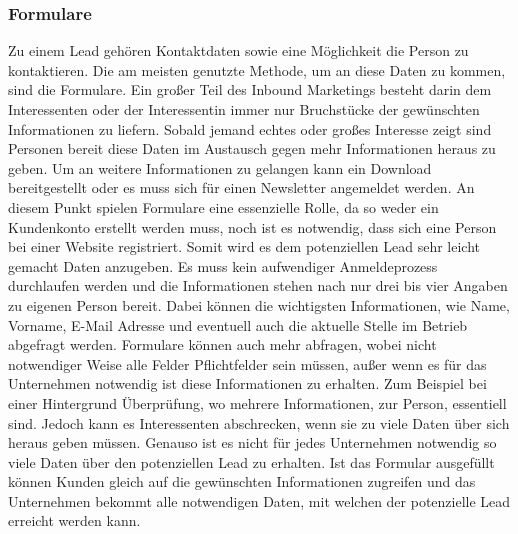 \subsubsection{Formulare}
Zu einem Lead gehören Kontaktdaten sowie eine Möglichkeit die Person zu kontaktieren. Die am meisten genutzte Methode, um an diese Daten zu kommen, sind die Formulare. 
\newline 
Ein großer Teil des Inbound Marketings besteht darin dem Interessenten oder der Interessentin immer nur Bruchstücke der gewünschten Informationen zu liefern. Sobald jemand echtes oder großes Interesse zeigt sind Personen bereit diese Daten im Austausch gegen mehr Informationen heraus zu geben. Um an weitere Informationen zu gelangen kann ein Download bereitgestellt oder es muss sich für einen Newsletter angemeldet werden. 
\newline
An diesem Punkt spielen Formulare eine essenzielle Rolle, da so weder ein Kundenkonto erstellt werden muss, noch ist es notwendig, dass sich eine Person bei einer Website registriert. Somit wird es dem potenziellen Lead sehr leicht gemacht Daten anzugeben. Es muss kein aufwendiger Anmeldeprozess durchlaufen werden und die Informationen stehen nach nur drei bis vier Angaben zu eigenen Person bereit. Dabei können die wichtigsten Informationen, wie Name, Vorname, E-Mail Adresse und eventuell auch die aktuelle Stelle im Betrieb abgefragt werden. Formulare können auch mehr abfragen, wobei nicht notwendiger Weise alle Felder Pflichtfelder sein müssen, außer wenn es für das Unternehmen notwendig ist diese Informationen zu erhalten. Zum Beispiel bei einer Hintergrund Überprüfung, wo mehrere Informationen, zur Person, essentiell sind. Jedoch kann es Interessenten abschrecken, wenn sie zu viele Daten über sich heraus geben müssen. Genauso ist es nicht für jedes Unternehmen notwendig so viele Daten über den potenziellen Lead zu erhalten. 
\newline
Ist das Formular ausgefüllt können Kunden gleich auf die gewünschten Informationen zugreifen und das Unternehmen bekommt alle notwendigen Daten, mit welchen der potenzielle Lead erreicht werden kann.

